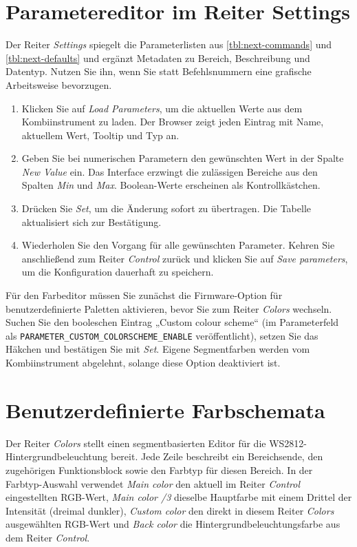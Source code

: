 \section{Parametereditor im Reiter Settings}
Der Reiter \emph{Settings} spiegelt die Parameterlisten aus \autoref{tbl:next-commands} und \autoref{tbl:next-defaults} und ergänzt Metadaten zu Bereich, Beschreibung und Datentyp.
Nutzen Sie ihn, wenn Sie statt Befehlsnummern eine grafische Arbeitsweise bevorzugen.

\begin{enumerate}
    \item Klicken Sie auf \emph{Load Parameters}, um die aktuellen Werte aus dem Kombiinstrument zu laden. Der Browser zeigt jeden Eintrag mit Name, aktuellem Wert, Tooltip und Typ an.
    \item Geben Sie bei numerischen Parametern den gewünschten Wert in der Spalte \emph{New Value} ein. Das Interface erzwingt die zulässigen Bereiche aus den Spalten \emph{Min} und \emph{Max}. Boolean-Werte erscheinen als Kontrollkästchen.
    \item Drücken Sie \emph{Set}, um die Änderung sofort zu übertragen. Die Tabelle aktualisiert sich zur Bestätigung.
    \item Wiederholen Sie den Vorgang für alle gewünschten Parameter. Kehren Sie anschließend zum Reiter \emph{Control} zurück und klicken Sie auf \emph{Save parameters}, um die Konfiguration dauerhaft zu speichern.
\end{enumerate}

Für den Farbeditor müssen Sie zunächst die Firmware-Option für benutzerdefinierte Paletten aktivieren, bevor Sie zum Reiter \emph{Colors} wechseln.
Suchen Sie den booleschen Eintrag „Custom colour scheme“ (im Parameterfeld als \verb|PARAMETER_CUSTOM_COLORSCHEME_ENABLE| veröffentlicht), setzen Sie das Häkchen und bestätigen Sie mit \emph{Set}. Eigene Segmentfarben werden vom Kombiinstrument abgelehnt, solange diese Option deaktiviert ist.

\section{Benutzerdefinierte Farbschemata}
Der Reiter \emph{Colors} stellt einen segmentbasierten Editor für die WS2812-Hintergrundbeleuchtung bereit. Jede Zeile beschreibt ein Bereichsende, den zugehörigen Funktionsblock sowie den Farbtyp für diesen Bereich. In der Farbtyp-Auswahl verwendet \emph{Main color} den aktuell im Reiter \emph{Control} eingestellten RGB-Wert, \emph{Main color /3} dieselbe Hauptfarbe mit einem Drittel der Intensität (dreimal dunkler), \emph{Custom color} den direkt in diesem Reiter \emph{Colors} ausgewählten RGB-Wert und \emph{Back color} die Hintergrundbeleuchtungsfarbe aus dem Reiter \emph{Control}.

